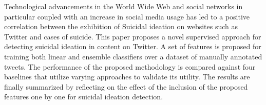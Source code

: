 Technological advancements in the World Wide Web and social networks in particular coupled with an increase in social media usage has led to a positive correlation between the exhibition of Suicidal ideation on websites such as Twitter and cases of suicide.  This paper proposes a novel supervised approach for detecting suicidal ideation in content on Twitter. A set of features is proposed for training both linear and ensemble classifiers over a dataset of manually annotated tweets. The performance of the proposed methodology is compared against four baselines that utilize varying approaches to validate its utility. The results are finally summarized by reflecting on the effect of the inclusion of the proposed features one by one for suicidal ideation detection.
